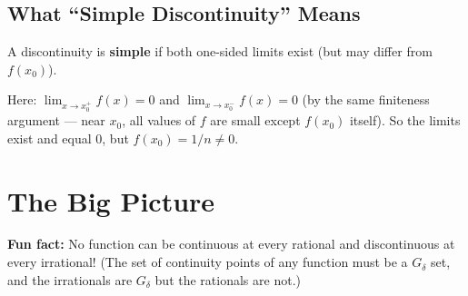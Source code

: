 \documentclass[12pt]{article}
\begin{document}
\subsection{What ``Simple Discontinuity'' Means}

A discontinuity is \textbf{simple} if both one-sided limits exist (but may differ from $f(x_0)$).

Here: $\lim_{x \to x_0^+} f(x) = 0$ and $\lim_{x \to x_0^-} f(x) = 0$ (by the same finiteness argument --- near $x_0$, all values of $f$ are small except $f(x_0)$ itself). So the limits exist and equal $0$, but $f(x_0) = 1/n \neq 0$.

\section{The Big Picture}

\begin{center}
\end{center}

\textbf{Fun fact:} No function can be continuous at every rational and discontinuous at every irrational! (The set of continuity points of any function must be a $G_\delta$ set, and the irrationals are $G_\delta$ but the rationals are not.)
\end{document}
